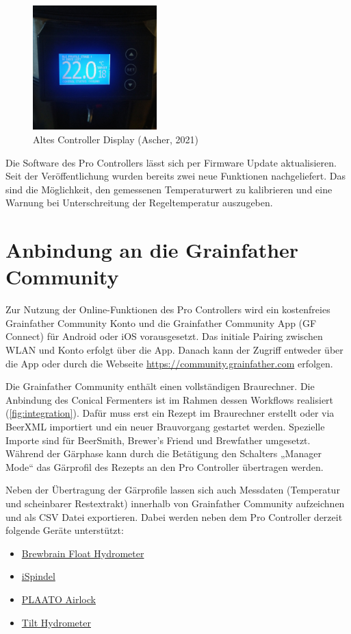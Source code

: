 \documentclass[a4paper,parskip=half]{scrartcl}
\begin{document}
\begin{figure}[H]
\centering
\includegraphics[width=4.8cm]{images/gfpc_display_old_main.jpg}
\caption{Altes Controller Display (Ascher, 2021)}
\label{fig:displayoldmain}
\end{figure}

Die Software des Pro Controllers lässt sich per Firmware Update
aktualisieren. Seit der Veröffentlichung wurden bereits zwei
neue Funktionen nachgeliefert. Das sind die Möglichkeit, den
gemessenen Temperaturwert zu kalibrieren und eine Warnung
bei Unterschreitung der Regeltemperatur auszugeben.

\section*{Anbindung an die Grainfather Community}

Zur Nutzung der Online-Funktionen des Pro Controllers wird ein
kostenfreies Grainfather Community Konto und die Grainfather
Community App (GF Connect) für Android oder iOS vorausgesetzt.
Das initiale Pairing zwischen WLAN und Konto erfolgt über die App.
Danach kann der Zugriff entweder über die App oder durch die
Webseite \url{https://community.grainfather.com} erfolgen.

Die Grainfather Community enthält einen vollständigen
Braurechner. Die Anbindung des Conical Fermenters ist
im Rahmen dessen Workflows realisiert (\autoref{fig:integration}).
Dafür muss erst ein Rezept im Braurechner erstellt oder
via BeerXML importiert und ein neuer Brauvorgang gestartet werden.
Spezielle Importe sind für BeerSmith, Brewer's Friend und
Brewfather umgesetzt. Während der Gärphase kann
durch die Betätigung den Schalters „Manager Mode“ das
Gärprofil des Rezepts an den Pro Controller übertragen werden.

Neben der Übertragung der Gärprofile lassen sich auch
Messdaten (Temperatur und scheinbarer Restextrakt) innerhalb von Grainfather Community aufzeichnen und als CSV Datei exportieren. Dabei werden neben dem Pro Controller derzeit folgende
Geräte unterstützt:
\begin{itemize}
\item \href{https://brewbrain.nl}{Brewbrain Float Hydrometer}
\item \href{https://www.ispindel.de}{iSpindel}
\item \href{https://plaato.io/products/plaato-airlock}{PLAATO Airlock} 
\item \href{https://tilthydrometer.com}{Tilt Hydrometer}
\end{itemize}
\end{document}
